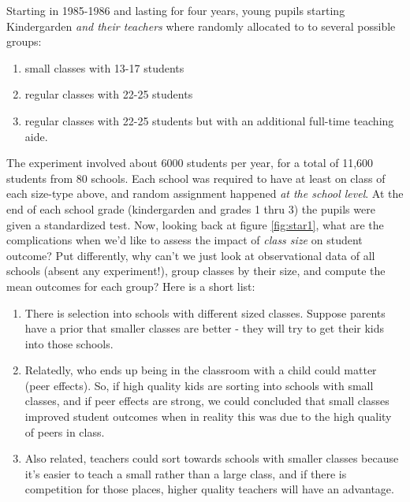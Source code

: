 \documentclass[]{book}
\providecommand{\tightlist}{%
  \setlength{\itemsep}{0pt}\setlength{\parskip}{0pt}}
\begin{document}
Starting in 1985-1986 and lasting for four years, young pupils starting
Kindergarden \emph{and their teachers} where randomly allocated to to
several possible groups:

\begin{enumerate}
\def\labelenumi{\arabic{enumi}.}
\tightlist
\item
  small classes with 13-17 students
\item
  regular classes with 22-25 students
\item
  regular classes with 22-25 students but with an additional full-time
  teaching aide.
\end{enumerate}

The experiment involved about 6000 students per year, for a total of
11,600 students from 80 schools. Each school was required to have at
least on class of each size-type above, and random assignment happened
\emph{at the school level}. At the end of each school grade
(kindergarden and grades 1 thru 3) the pupils were given a standardized
test. Now, looking back at figure \ref{fig:star1}, what are the
complications when we'd like to assess the impact of \emph{class size}
on student outcome? Put differently, why can't we just look at
observational data of all schools (absent any experiment!), group
classes by their size, and compute the mean outcomes for each group?
Here is a short list:

\begin{enumerate}
\def\labelenumi{\arabic{enumi}.}
\tightlist
\item
  There is selection into schools with different sized classes. Suppose
  parents have a prior that smaller classes are better - they will try
  to get their kids into those schools.
\item
  Relatedly, who ends up being in the classroom with a child could
  matter (peer effects). So, if high quality kids are sorting into
  schools with small classes, and if peer effects are strong, we could
  concluded that small classes improved student outcomes when in reality
  this was due to the high quality of peers in class.
\item
  Also related, teachers could sort towards schools with smaller classes
  because it's easier to teach a small rather than a large class, and if
  there is competition for those places, higher quality teachers will
  have an advantage.
\end{enumerate}
\end{document}
